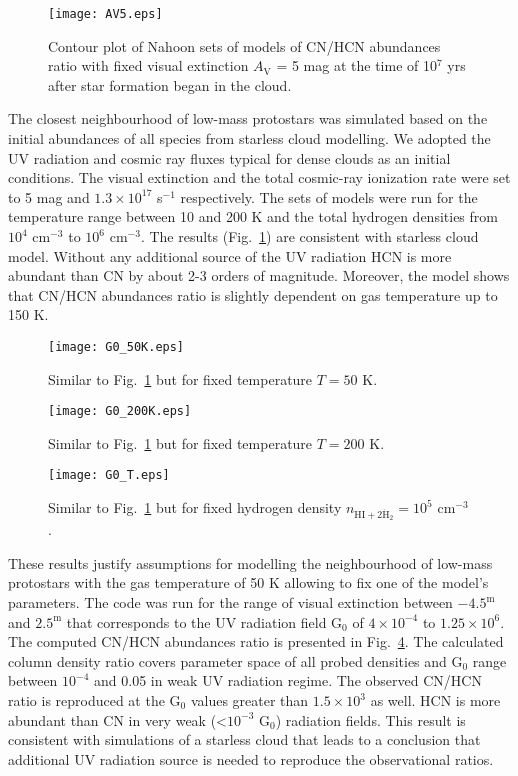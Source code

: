 \documentclass{aa}
\begin{document}
\begin{figure}
\centering
\texttt{[image: AV5.eps]}
\caption{Contour plot of Nahoon sets of models of CN/HCN abundances ratio with fixed visual extinction $A_\mathrm{V}$ = 5 mag at the time of 10$^{7}$ yrs after star formation began in the cloud.} 
\label{AV5}
\end{figure}

The closest neighbourhood of low-mass protostars was simulated based on the initial abundances of all species from starless cloud modelling. We adopted the UV radiation and cosmic ray fluxes typical for dense clouds as an initial conditions. The visual extinction and the total cosmic-ray ionization rate were set to 5 mag and $1.3\times 10^{17}$ s$^{-1}$ respectively. The sets of models were run for the temperature range between 10 and 200 K and the total hydrogen densities from $10^4$ cm$^{-3}$ to $10^6$ cm$^{-3}$. The results (Fig.~\ref{AV5}) are consistent with starless cloud model. Without any additional source of the UV radiation HCN is more abundant than CN by about 2-3 orders of magnitude. Moreover, the model shows that CN/HCN abundances ratio is slightly dependent on gas temperature up to 150 K. 

\begin{figure}
\centering
\texttt{[image: G0\_50K.eps]}
\caption{Similar to Fig.~\ref{AV5} but for fixed temperature $T = 50$ K.}
\label{G0}
\end{figure}

\begin{figure}
\centering
\texttt{[image: G0\_200K.eps]}
\caption{Similar to Fig.~\ref{AV5} but for fixed temperature $T = 200$ K.}
\label{G0}
\end{figure}

\begin{figure}
\centering
\texttt{[image: G0\_T.eps]}
\caption{Similar to Fig.~\ref{AV5} but for fixed hydrogen density $n_\mathrm{HI+2 \dot H_2} = 10^5$ cm$^{-3}$.}
\label{G0}
\end{figure}

These results justify assumptions for modelling the neighbourhood of low-mass protostars with the gas temperature of 50 K allowing to fix one of the model’s parameters. The code was run for the range of visual extinction between $-4.5^{\mathrm{m}}$ and $2.5^{\mathrm{m}}$ that corresponds to the UV radiation field G$_0$ of $4\times 10^{-4}$ to $1.25\times 10^{6}$. The computed CN/HCN abundances ratio is presented in Fig.~\ref{G0}. The calculated column density ratio covers parameter space of all probed densities and G$_0$ range between $10^{-4}$ and 0.05 in weak UV radiation regime. The observed CN/HCN ratio is reproduced at the G$_0$ values greater than $1.5 \times 10^{3}$ as well. HCN is more abundant than CN in very weak (<$10^{-3}$ G$_0$) radiation fields. This result is consistent with simulations of a starless cloud that leads to a conclusion that additional UV radiation source is needed to reproduce the observational ratios. 
\end{document}
